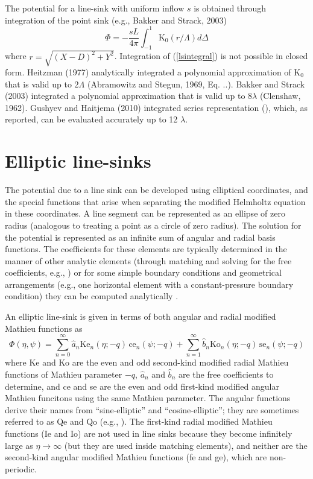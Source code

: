 \documentclass{elsart}
\begin{document}
The potential for a line-sink with uniform inflow $s$ is obtained through integration of the point sink (e.g., Bakker and Strack, 2003)
\begin{equation} \label{lsintegral}
\Phi = -\frac{sL}{4\pi} \int_{-1}^{1}\text{K}_0(r/\Lambda) d\Delta
\end{equation}
where $r=\sqrt{(X-D)^2+Y^2}$. Integration of (\ref{lsintegral}) is not possible in closed form. Heitzman (1977) analytically integrated a polynomial approximation of K$_0$ that is valid up to $2\Lambda$ (Abramowitz and Stegun, 1969, Eq. ..). Bakker and Strack (2003) integrated a polynomial approximation that is valid up to $8\lambda$ (Clenshaw, 1962). Gushyev and Haitjema (2010) integrated series representation (), which, as reported, can be evaluated accurately up to 12 $\lambda$.  

\section{Elliptic line-sinks}
The potential due to a line sink can be developed using elliptical coordinates, and the special functions that arise when separating the modified Helmholtz equation in these coordinates.  A line segment can be represented as an ellipse of zero radius (analogous to treating a point as a circle of zero radius).  The solution for the potential is represented as an infinite sum of angular and radial basis functions.  The coefficients for these elements are typically determined in the manner of other analytic elements (through matching and solving for the free coefficients, e.g., \cite{bakker2004two}) or for some simple boundary conditions and geometrical arrangements (e.g., one horizontal element with a constant-pressure boundary condition) they can be computed analytically \cite{kuhlmanwarrick08,kuhlmanneuman09}.

An elliptic line-sink is given in terms of both angular and radial modified Mathieu functions as
\begin{equation}
  \label{eq:ellipse-line-sink}
  \Phi(\eta,\psi) = \sum_{n=0}^{\infty} \hat{a}_n \text{Ke}_{n}(\eta;-q) \, \text{ce}_{n}(\psi;-q) + \sum_{n=1}^{\infty} \hat{b}_n \text{Ko}_{n}(\eta;-q) \, \text{se}_{n}(\psi;-q)
\end{equation}
where Ke and Ko are the even and odd second-kind modified radial Mathieu functions of Mathieu parameter $-q$, $\hat{a}_n$ and $\hat{b}_n$ are the free coefficients to determine, and ce and se are the even and odd first-kind modified angular Mathieu funcitons using the same Mathieu parameter.  The angular functions derive their names from ``sine-elliptic'' and ``cosine-elliptic''; they are sometimes referred to as Qe and Qo (e.g., \cite{alhargan2000}).  The first-kind radial modified Mathieu functions (Ie and Io) are not used in line sinks because they become infinitely large as $\eta \rightarrow \infty$ (but they are used inside matching elements), and neither are the second-kind angular modified Mathieu functions (fe and ge), which are non-periodic.
\end{document}
